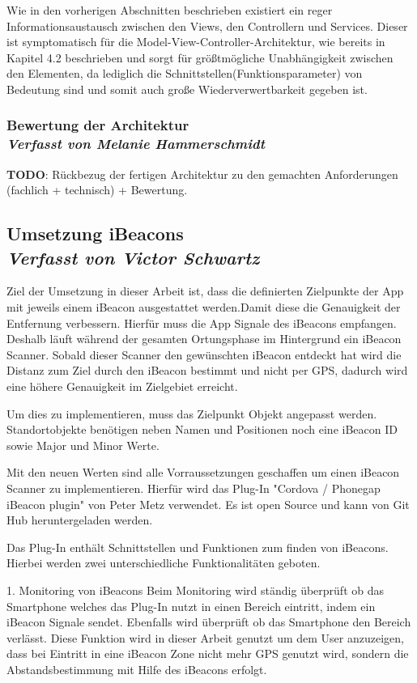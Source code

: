 Wie in den vorherigen Abschnitten beschrieben existiert ein reger Informationsaustausch zwischen den Views, den Controllern und Services. Dieser ist symptomatisch für die Model-View-Controller-Architektur, wie bereits in Kapitel 4.2 beschrieben und sorgt für größtmögliche Unabhängigkeit zwischen den Elementen, da lediglich die Schnittstellen(Funktionsparameter) von Bedeutung sind und somit auch große Wiederverwertbarkeit gegeben ist.

\subsubsection[Bewertung der Architektur]{Bewertung der Architektur
 \\ \textnormal{\small{\textit {Verfasst von Melanie Hammerschmidt}}}}
 
\textbf{TODO}: Rückbezug der fertigen Architektur zu den gemachten Anforderungen (fachlich + technisch) + Bewertung.
\subsection[Umsetzung iBeacons]{Umsetzung iBeacons
 \\ \textnormal{\small{\textit {Verfasst von Victor Schwartz}}}}

Ziel der Umsetzung in dieser Arbeit ist, dass die definierten Zielpunkte der App mit jeweils einem iBeacon ausgestattet werden.Damit diese die Genauigkeit der Entfernung verbessern.
Hierfür muss die App Signale des iBeacons empfangen. Deshalb läuft während der gesamten Ortungsphase im Hintergrund ein iBeacon Scanner. Sobald dieser Scanner den gewünschten iBeacon entdeckt hat wird die Distanz zum Ziel durch den iBeacon bestimmt und nicht per GPS, dadurch wird eine höhere Genauigkeit im Zielgebiet erreicht.

Um dies zu implementieren, muss das Zielpunkt Objekt angepasst werden. Standortobjekte benötigen neben Namen und Positionen noch eine iBeacon ID sowie Major und Minor Werte.

Mit den neuen Werten sind alle Vorraussetzungen geschaffen um einen iBeacon Scanner zu implementieren. Hierfür wird das Plug-In "Cordova / Phonegap iBeacon plugin" von Peter Metz verwendet. Es ist open Source und kann von Git Hub heruntergeladen werden.

Das Plug-In enthält Schnittstellen und Funktionen zum finden von iBeacons. Hierbei werden zwei unterschiedliche Funktionalitäten geboten.


1. Monitoring von iBeacons
Beim Monitoring wird ständig überprüft ob das Smartphone welches das Plug-In nutzt in einen Bereich eintritt, indem ein iBeacon Signale sendet. Ebenfalls wird überprüft ob das Smartphone den Bereich verlässt. Diese Funktion wird in dieser Arbeit genutzt um dem User anzuzeigen, dass bei Eintritt in eine iBeacon Zone nicht mehr GPS genutzt wird, sondern die Abstandsbestimmung mit Hilfe des iBeacons erfolgt.

